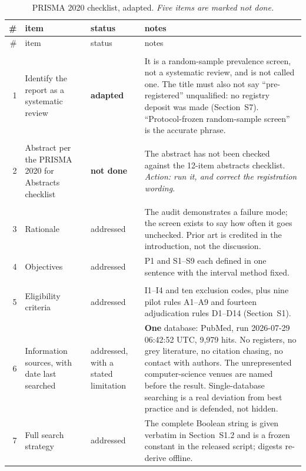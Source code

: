 \documentclass[11pt,a4paper]{article}
\begin{document}
{\small
\begin{longtable}{@{}rL{3.5cm}L{2.6cm}L{6.2cm}@{}}
\caption{PRISMA 2020 checklist, adapted. \emph{Five items are marked not done.}}
\label{tab:prisma}\\
\toprule
\# & item & status & notes \\
\midrule
\endfirsthead
\toprule
\# & item & status & notes \\
\midrule
\endhead
\bottomrule
\endfoot
{} \\
1 & Identify the report as a systematic review & \textbf{adapted} & It is a random-sample prevalence screen, not a systematic review, and is not called one. The title must also not say ``pre-registered'' unqualified: no registry deposit was made (Section~S7). ``Protocol-frozen random-sample screen'' is the accurate phrase. \\
\addlinespace
{} \\
2 & Abstract per the PRISMA 2020 for Abstracts checklist & \textbf{not done} & The abstract has not been checked against the 12-item abstracts checklist. \emph{Action: run it, and correct the registration wording.} \\
\addlinespace
{} \\
3 & Rationale & addressed & The audit demonstrates a failure mode; the screen exists to say how often it goes unchecked. Prior art is credited in the introduction, not the discussion. \\
4 & Objectives & addressed & P1 and S1--S9 each defined in one sentence with the interval method fixed. \\
\addlinespace
{} \\
5 & Eligibility criteria & addressed & I1--I4 and ten exclusion codes, plus nine pilot rules A1--A9 and fourteen adjudication rules D1--D14 (Section~S1). \\
6 & Information sources, with date last searched & addressed, with a stated limitation & \textbf{One} database: PubMed, run 2026-07-29 06:42:52 UTC, 9{,}979 hits. No registers, no grey literature, no citation chasing, no contact with authors. The unrepresented computer-science venues are named before the result. Single-database searching is a real deviation from best practice and is defended, not hidden. \\
7 & Full search strategy & addressed & The complete Boolean string is given verbatim in Section~S1.2 and is a frozen constant in the released script; digests re-derive offline. \\

\end{longtable}}
\end{document}
